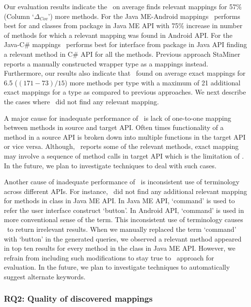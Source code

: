 Our evaluation results indicate the \tool\ on average finds relevant mappings for 57\% (Column `$\Delta_{Cov}$') more methods. 
For the Java ME-Android mappings \tool\ performs best for 
and  classes from  
package in Java ME API with 75\% increase in number of methods
for which a relevant mapping was found in Android API.
For the Java-C\# mappings \tool\ performs best for  interface from  package in Java API
finding a relevant method in C\# API for all the methods.
Previous approach StaMiner reports a manually constructed wrapper type as a mappings instead.
Furthermore, our results also indicate that \tool\ found on average exact mappings for 6.5 ($(171-73)/15$) more methods per type with a maximum of 21 additional exact mappings for a  type as compared to previous approaches.
We next describe the cases where \tool\ did not find any relevant mapping.

A major cause for inadequate performance of \tool\ is 
lack of one-to-one mapping between methods in source and target API.
Often times functionality of a method in a source API 
is broken down into multiple functions in the target API or vice versa.
Although, \tool\ reports some of the relevant methods, exact mapping may involve a sequence of method calls in target API which is the limitation of \tool.
In the future, we plan to investigate techniques to deal with such cases.


Another cause of inadequate performance of \tool\ is 
inconsistent use of terminology across different APIs.
For instance, \tool\ did not find any additional relevant mapping for methods in  class in Java ME API.
In Java ME API, `command' is used to refer the user interface construct `button'.
In Android API, `command' is used in more conventional sense of the term.
This inconsistent use of terminology causes \tool\ to return irrelevant results. 
When we manually replaced the term `command' with `button' in the generated queries,
we observed a relevant method appeared in top ten results for every method in the  class in Java ME API.
However, we refrain from including such modifications to stay true to \tool\ approach for evaluation.
In the future, we plan to investigate techniques to automatically suggest alternate keywords.


\subsubsection{RQ2: Quality of discovered mappings}

